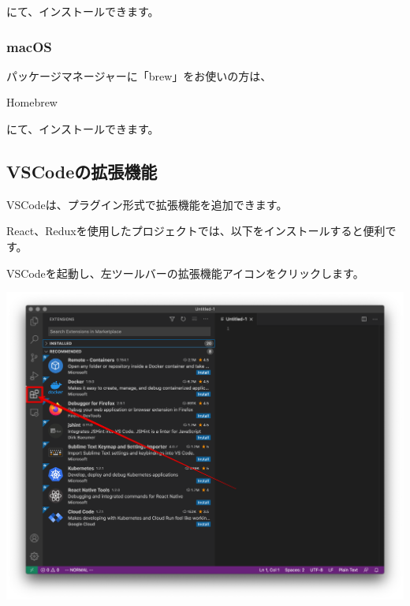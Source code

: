 にて、インストールできます。

\subsubsection*{macOS}
\keeplastskip{
  \label{sec:1-2-1-2}
  \par\nobreak
}

パッケージマネージャーに「brew」をお使いの方は、\\[0pt]

\def\startercodeblockfontsize{}
\begin{starterterminal}[]{Homebrew}\end{starterterminal}

にて、インストールできます。

\subsection{VSCodeの拡張機能}
\keeplastskip{
  \label{sec:1-2-2}
  \par\nobreak
}

VSCodeは、プラグイン形式で拡張機能を追加できます。

React、Reduxを使用したプロジェクトでは、以下をインストールすると便利です。

VSCodeを起動し、左ツールバーの拡張機能アイコンをクリックします。

\begin{reviewimage}[H]%
\includegraphics[width=1.0\maxwidth]{./images/01-createDevEnv/01_03vscodeExtension.png}%
\label{image:01-createDevEnv:01_03vscodeExtension}
\end{reviewimage}

